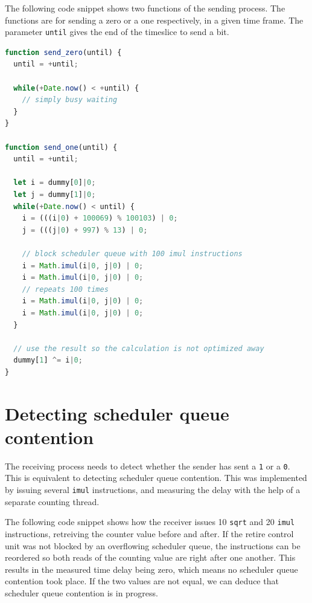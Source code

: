 \documentclass[11pt,
  titlepage=false,
]{scrreprt}
\begin{document}
The following code snippet shows two functions of the sending process.
The functions are for sending a zero or a one respectively, in a given time frame.
The parameter \texttt{until} gives the end of the timeslice to send a bit.
\begin{lstlisting}[language=JavaScript]
function send_zero(until) {
  until = +until;

  while(+Date.now() < +until) {
    // simply busy waiting
  }
}

function send_one(until) {
  until = +until;

  let i = dummy[0]|0;
  let j = dummy[1]|0;
  while(+Date.now() < until) {
    i = (((i|0) + 100069) % 100103) | 0;
    j = (((j|0) + 997) % 13) | 0;

    // block scheduler queue with 100 imul instructions
    i = Math.imul(i|0, j|0) | 0;
    i = Math.imul(i|0, j|0) | 0;
    // repeats 100 times
    i = Math.imul(i|0, j|0) | 0;
    i = Math.imul(i|0, j|0) | 0;
  }

  // use the result so the calculation is not optimized away
  dummy[1] ^= i|0;
}
\end{lstlisting}

\section{Detecting scheduler queue contention}
The receiving process needs to detect whether the sender has sent a \texttt{1} or a \texttt{0}.
This is equivalent to detecting scheduler queue contention.
This was implemented by issuing several \texttt{imul} instructions,
and measuring the delay with the help of a separate counting thread.

The following code snippet shows how the receiver issues 10 \texttt{sqrt} and 20 \texttt{imul} instructions,
retreiving the counter value before and after.
If the retire control unit was not blocked by an overflowing scheduler queue,
the instructions can be reordered so both reads of the counting value are right after one another.
This results in the measured time delay being zero, which means no scheduler queue contention took place.
If the two values are not equal, we can deduce that scheduler queue contention is in progress.
\end{document}
